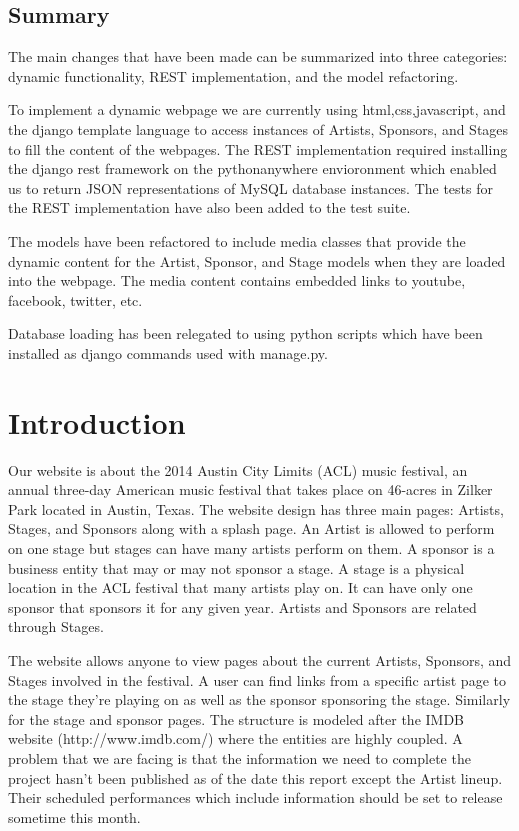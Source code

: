 \documentclass[12pt,english]{scrartcl}
\begin{document}
\subsection{Summary}
The main changes that have been made can be summarized into three categories: dynamic functionality, REST implementation, and the model refactoring. 

To implement a dynamic webpage we are currently using html,css,javascript, and the django template language to access instances of Artists, Sponsors, and Stages to fill the content of the webpages. 
The REST implementation required installing the django rest framework on the pythonanywhere envioronment which enabled us to return JSON representations of MySQL database instances. 
The tests for the REST implementation have also been added to the test suite.

The models have been refactored to include media classes that provide the dynamic content for the Artist,
Sponsor, and Stage models when they are loaded into the webpage. The media content contains embedded links to youtube, facebook, twitter, etc. 

Database loading has been relegated to using python scripts which have been installed as django commands used with manage.py. 
\section{Introduction}
Our website is about the 2014 Austin City Limits (ACL) music festival, an annual three-day American music festival that takes place on 46-acres in Zilker Park located in Austin, Texas. 
The website design has three main pages: Artists, Stages, and Sponsors along with a splash page. An Artist is allowed to perform on one stage but stages can have many artists perform on them.
A sponsor is a business entity that may or may not sponsor a stage. A stage is a physical location in the ACL festival that many artists play on. 
It can have only one sponsor that sponsors it for any given year. Artists and Sponsors are related through Stages.

The website allows anyone to view pages about the current Artists, Sponsors, and Stages involved in the festival. A user can find links from a specific artist page to the stage they're playing on
as well as the sponsor sponsoring the stage. Similarly for the stage and sponsor pages. The structure is modeled after the IMDB website (http://www.imdb.com/) where the entities are highly coupled.
A problem that we are facing is that the information we need to complete the project hasn't been published as of the date this report except the Artist lineup. Their scheduled performances which 
include information should be set to release sometime this month.
\end{document}
